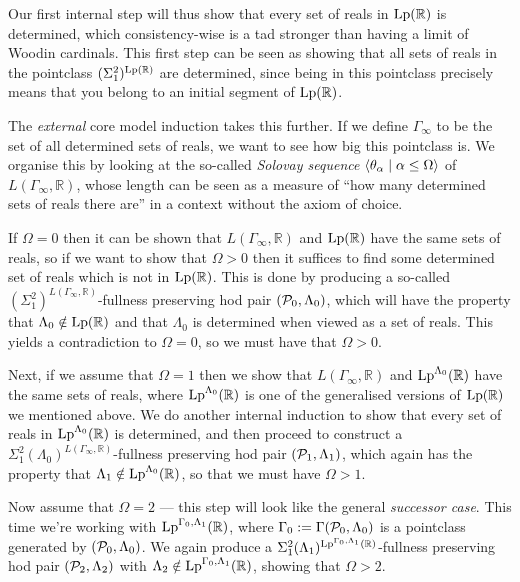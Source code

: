 \documentclass[../../main]{subfiles}
\begin{document}
\qquad Our first internal step will thus show that every set of reals in $\lp(\mathbb R)$ is determined, which consistency-wise is a tad stronger than having a limit of Woodin cardinals. This first step can be seen as showing that all sets of reals in the pointclass $(\Sigma^2_1)^{\lp(\mathbb R)}$  are determined, since being in this pointclass precisely means that you belong to an initial segment of $\lp(\mathbb R)$.

\qquad The \textit{external} core model induction takes this further. If we define $\Gamma_\infty$ to be the set of all determined sets of reals, we want to see how big this pointclass is. We organise this by looking at the so-called \textit{Solovay sequence} $\bra{\theta_\alpha\mid\alpha\leq\Omega}$ of $L(\Gamma_\infty,\mathbb R)$, whose length can be seen as a measure of ``how many determined sets of reals there are'' in a context without the axiom of choice.

\qquad If $\Omega=0$ then it can be shown that $L(\Gamma_\infty,\mathbb R)$ and $\lp(\mathbb R)$ have the same sets of reals, so if we want to show that $\Omega>0$ then it suffices to find some determined set of reals which is not in $\lp(\mathbb R)$. This is done by producing a so-called $(\Sigma^2_1)^{L(\Gamma_\infty,\mathbb R)}$-fullness preserving hod pair $(\P_0,\Lambda_0)$, which will have the property that $\Lambda_0\notin\lp(\mathbb R)$ and that $\Lambda_0$ is determined when viewed as a set of reals. This yields a contradiction to $\Omega=0$, so we must have that $\Omega>0$.

\qquad Next, if we assume that $\Omega=1$ then we show that $L(\Gamma_\infty,\mathbb R)$ and $\lp^{\Lambda_0}(\mathbb R)$ have the same sets of reals, where $\lp^{\Lambda_0}(\mathbb R)$ is one of the generalised versions of $\lp(\mathbb R)$ we mentioned above. We do another internal induction to show that every set of reals in $\lp^{\Lambda_0}(\mathbb R)$ is determined, and then proceed to construct a $\Sigma^2_1(\Lambda_0)^{L(\Gamma_\infty,\mathbb R)}$-fullness preserving hod pair $(\P_1,\Lambda_1)$, which again has the property that $\Lambda_1\notin\lp^{\Lambda_0}(\mathbb R)$, so that we must have $\Omega>1$.

\qquad Now assume that $\Omega=2$ --- this step will look like the general \textit{successor case}. This time we're working with $\lp^{\Gamma_0,\Lambda_1}(\mathbb R)$, where $\Gamma_0:=\Gamma(\P_0,\Lambda_0)$ is a pointclass generated by $(\P_0,\Lambda_0)$. We again produce a $\Sigma^2_1(\Lambda_1)^{\lp^{\Gamma_0,\Lambda_1}(\mathbb R)}$-fullness preserving hod pair $(\P_2,\Lambda_2)$ with $\Lambda_2\notin\lp^{\Gamma_0,\Lambda_1}(\mathbb R)$, showing that $\Omega>2$.
\end{document}
